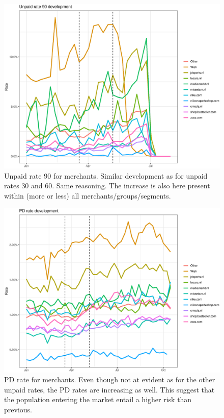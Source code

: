 \begin{figure}[!ht]
  \centering
  \includegraphics[width=5in,trim={0 0 0 0},clip]{content/figures/rate90_dev_nl_mer.eps} 
  \caption{Unpaid rate 90 for merchants. Similar development as for unpaid rates 30 and 60. Same reasoning. The increase is also here present within (more or less) all merchants/groups/segments.}
  \label{fig:rate90_dev_mer}
\end{figure}

\begin{figure}[!ht]
  \centering
  \includegraphics[width=5in,trim={0 0 0 0},clip]{content/figures/pd_dev_nl_mer.eps} 
  \caption{PD rate for merchants. Even though not at evident as for the other unpaid rates, the PD rates are increasing as well. This suggest that the population entering the market entail a higher risk than previous.}
  \label{fig:pd_dev_mer}
\end{figure}

